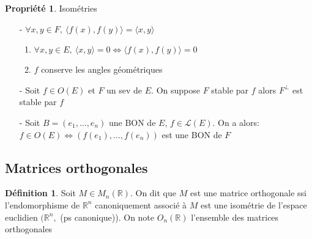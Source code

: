 \documentclass[fleqn]{article}
\theoremstyle{definition} \newtheorem*{defi}{D\'efinition}
\theoremstyle{definition} \newtheorem*{theo}{Th\'eor\`eme}
\theoremstyle{definition} \newtheorem*{coro}{Corollaire}
\theoremstyle{remark} \newtheorem*{rqs}{Remarques}
\theoremstyle{definition} \newtheorem*{prop}{Propri\'et\'e}
\begin{document}
\begin{prop} Isom\'etries
	\begin{enumerate}
		\item [-] $\forall x,y \in F,\ \langle f(x), f(y) \rangle = \langle x,y \rangle$
			\begin{enumerate}
				\item $\forall x,y \in E,\ \langle x,y \rangle = 0 \Leftrightarrow \langle f(x), f(y) \rangle = 0$
				\item $f$ conserve les angles g\'eom\'etriques
			\end{enumerate}
		\item [-] Soit $f \in O(E)$ et $F$ un sev de $E$. On suppose $F$ stable par $f$ alors $F^\perp$ est stable par $f$
		\item [-] Soit $B = (e_1, \hdots, e_n)$ une BON de $E$, $f \in \mathscr{L}(E)$. On a alors:\\
			$f \in O(E) \Leftrightarrow (f(e_1), \hdots, f(e_n))$ est une BON de $F$
	\end{enumerate}
\end{prop}

\subsection{Matrices orthogonales}

\begin{defi}
	Soit $M \in M_n(\mathbb{R})$. On dit que $M$ est une matrice orthogonale ssi l'endomorphisme de $\mathbb{R}^n$ canoniquement
	associ\'e \`a $M$ est une isom\'etrie de l'espace euclidien $(\mathbb{R}^n,$ (ps canonique)). On note $O_n(\mathbb{R})$ l'ensemble des
	matrices orthogonales
\end{defi}
\end{document}
